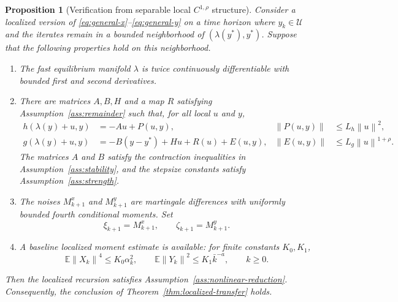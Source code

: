 \documentclass{article}
\newtheorem{proposition}[theorem]{Proposition}
\newcommand{\E}{\mathbb{E}}
\newcommand{\norm}[1]{\left\lVert #1\right\rVert}
\begin{document}
\begin{proposition}[Verification from separable local $C^{1,\rho}$ structure]\label{prop:verification}
Consider a localized version of \eqref{eq:general-x}--\eqref{eq:general-y} on a time horizon where $y_k\in\mathcal U$ and the iterates remain in a bounded neighborhood of $(\lambda(y^*),y^*)$. Suppose that the following properties hold on this neighborhood.
\begin{enumerate}[leftmargin=*]
\item The fast equilibrium manifold $\lambda$ is twice continuously differentiable with bounded first and second derivatives.

\item There are matrices $A,B,H$ and a map $R$ satisfying Assumption~\ref{ass:remainder} such that, for all local $u$ and $y$,
\begin{align}
  h(\lambda(y)+u,y)
  &=-Au+P(u,y),
  &
  \norm{P(u,y)}
  &\le L_h\norm{u}^2, \label{eq:h-local}\\
  g(\lambda(y)+u,y)
  &=-B(y-y^*)+Hu+R(u)+E(u,y),
  &
  \norm{E(u,y)}
  &\le L_g\norm{u}^{1+\rho}. \label{eq:g-local}
\end{align}
The matrices $A$ and $B$ satisfy the contraction inequalities in Assumption~\ref{ass:stability}, and the stepsize constants satisfy Assumption~\ref{ass:strength}.

\item The noises $M^x_{k+1}$ and $M^y_{k+1}$ are martingale differences with uniformly bounded fourth conditional moments. Set
\[
  \xi_{k+1}=M^x_{k+1},
  \qquad
  \zeta_{k+1}=M^y_{k+1}.
\]

\item A baseline localized moment estimate is available: for finite constants $K_0,K_1$,
\begin{equation}
  \E\norm{X_k}^4\le K_0\alpha_k^2,
  \qquad
  \E\norm{Y_k}^2\le K_1\bar k^{-a},
  \qquad k\ge0. \label{eq:baseline-localization}
\end{equation}
\end{enumerate}
Then the localized recursion satisfies Assumption~\ref{ass:nonlinear-reduction}. Consequently, the conclusion of Theorem~\ref{thm:localized-transfer} holds.
\end{proposition}
\end{document}
